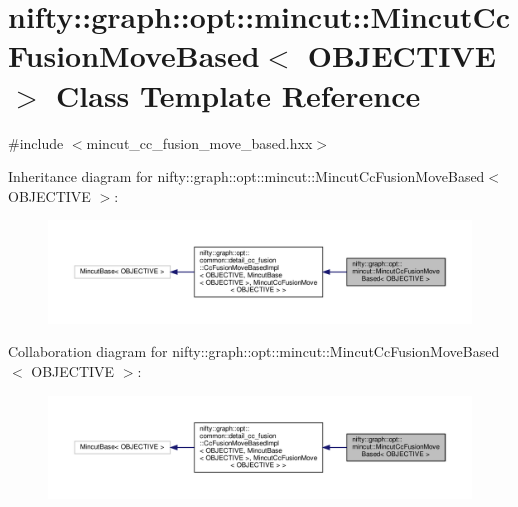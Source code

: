 \hypertarget{classnifty_1_1graph_1_1opt_1_1mincut_1_1MincutCcFusionMoveBased}{}\section{nifty\+:\+:graph\+:\+:opt\+:\+:mincut\+:\+:Mincut\+Cc\+Fusion\+Move\+Based$<$ O\+B\+J\+E\+C\+T\+I\+VE $>$ Class Template Reference}
\label{classnifty_1_1graph_1_1opt_1_1mincut_1_1MincutCcFusionMoveBased}


{\ttfamily \#include $<$mincut\+\_\+cc\+\_\+fusion\+\_\+move\+\_\+based.\+hxx$>$}



Inheritance diagram for nifty\+:\+:graph\+:\+:opt\+:\+:mincut\+:\+:Mincut\+Cc\+Fusion\+Move\+Based$<$ O\+B\+J\+E\+C\+T\+I\+VE $>$\+:
\nopagebreak
\begin{figure}[H]
\begin{center}
\leavevmode
\includegraphics[width=350pt]{classnifty_1_1graph_1_1opt_1_1mincut_1_1MincutCcFusionMoveBased__inherit__graph}
\end{center}
\end{figure}


Collaboration diagram for nifty\+:\+:graph\+:\+:opt\+:\+:mincut\+:\+:Mincut\+Cc\+Fusion\+Move\+Based$<$ O\+B\+J\+E\+C\+T\+I\+VE $>$\+:
\nopagebreak
\begin{figure}[H]
\begin{center}
\leavevmode
\includegraphics[width=350pt]{classnifty_1_1graph_1_1opt_1_1mincut_1_1MincutCcFusionMoveBased__coll__graph}
\end{center}
\end{figure}
